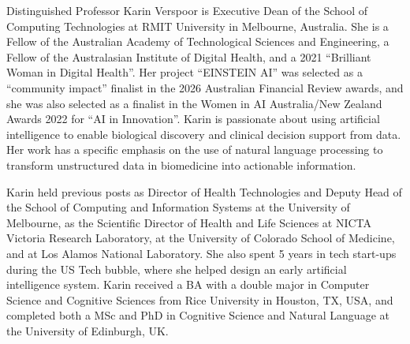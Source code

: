 Distinguished Professor Karin Verspoor is Executive Dean of the School of Computing Technologies at RMIT University in Melbourne, Australia. She is a Fellow of the Australian Academy of Technological Sciences and Engineering, a Fellow of the Australasian Institute of Digital Health, and a 2021 “Brilliant Woman in Digital Health”. Her project “EINSTEIN AI” was selected as a “community impact” finalist in the 2026 Australian Financial Review awards, and she was also selected as a finalist in the Women in AI Australia/New Zealand Awards 2022 for “AI in Innovation”. Karin is passionate about using artificial intelligence to enable biological discovery and clinical decision support from data. Her work has a specific emphasis on the use of natural language processing to transform unstructured data in biomedicine into actionable information.

Karin held previous posts as Director of Health Technologies and Deputy Head of the School of Computing and Information Systems at the University of Melbourne, as the Scientific Director of Health and Life Sciences at NICTA Victoria Research Laboratory, at the University of Colorado School of Medicine, and at Los Alamos National Laboratory. She also spent 5 years in tech start-ups during the US Tech bubble, where she helped design an early artificial intelligence system. Karin received a BA with a double major in Computer Science and Cognitive Sciences from Rice University in Houston, TX, USA, and completed both a MSc and PhD in Cognitive Science and Natural Language at the University of Edinburgh, UK.